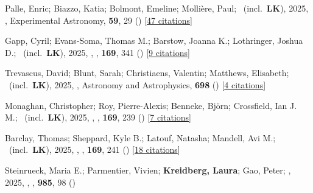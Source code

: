\item[{\color{numcolor}\scriptsize139}] Palle, Enric; Biazzo, Katia; Bolmont, Emeline; Molli{\`e}re, Paul; \etal\ (incl.\ \textbf{LK}), 2025, , Experimental Astronomy, \textbf{59}, 29 () [\href{https://ui.adsabs.harvard.edu/abs/2025ExA....59...29P}{47 citations}]

\item[{\color{numcolor}\scriptsize138}] Gapp, Cyril; Evans-Soma, Thomas M.; Barstow, Joanna K.; Lothringer, Joshua D.; \etal\ (incl.\ \textbf{LK}), 2025, , \aj, \textbf{169}, 341 () [\href{https://ui.adsabs.harvard.edu/abs/2025AJ....169..341G}{9 citations}]

\item[{\color{numcolor}\scriptsize137}] Trevascus, David; Blunt, Sarah; Christiaens, Valentin; Matthews, Elisabeth; \etal\ (incl.\ \textbf{LK}), 2025, , Astronomy and Astrophysics, \textbf{698} () [\href{https://ui.adsabs.harvard.edu/abs/2025A&A...698A..19T}{4 citations}]

\item[{\color{numcolor}\scriptsize136}] Monaghan, Christopher; Roy, Pierre-Alexis; Benneke, Bj{\"o}rn; Crossfield, Ian J. M.; \etal\ (incl.\ \textbf{LK}), 2025, , \aj, \textbf{169}, 239 () [\href{https://ui.adsabs.harvard.edu/abs/2025AJ....169..239M}{7 citations}]

\item[{\color{numcolor}\scriptsize135}] Barclay, Thomas; Sheppard, Kyle B.; Latouf, Natasha; Mandell, Avi M.; \etal\ (incl.\ \textbf{LK}), 2025, , \aj, \textbf{169}, 241 () [\href{https://ui.adsabs.harvard.edu/abs/2025AJ....169..241B}{18 citations}]

\item[{\color{numcolor}\scriptsize134}] Steinrueck, Maria E.; Parmentier, Vivien; \textbf{Kreidberg, Laura}; Gao, Peter; \etal, 2025, , \apj, \textbf{985}, 98 ()

